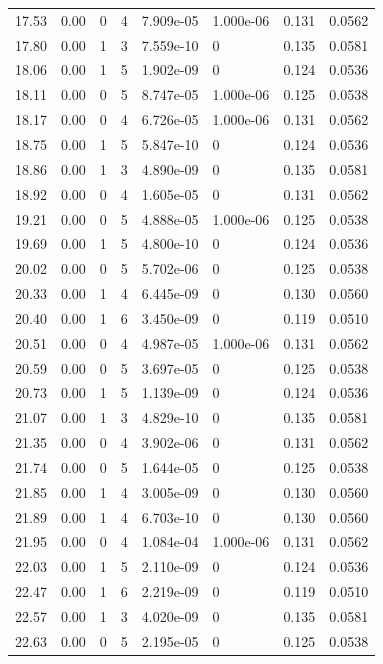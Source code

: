 \documentclass[preview]{standalone}
\begin{document}
{{{\begin{tabular}{L{1.2cm}C{1.2cm} C{0.3cm}C{0.5cm} C{1.4cm}C{1.4cm} C{1.4cm}C{1.4cm}}
  17.53  &  0.00  & 0     &  4 &  7.909e-05  & 1.000e-06  & 0.131 &  0.0562   \\ 
  17.80  &  0.00  & 1     &  3 &  7.559e-10  & 0  & 0.135 &  0.0581   \\ 
  18.06  &  0.00  & 1     &  5 &  1.902e-09  & 0  & 0.124 &  0.0536   \\ 
  18.11  &  0.00  & 0     &  5 &  8.747e-05  & 1.000e-06  & 0.125 &  0.0538   \\ 
  18.17  &  0.00  & 0     &  4 &  6.726e-05  & 1.000e-06  & 0.131 &  0.0562   \\ 
  18.75  &  0.00  & 1     &  5 &  5.847e-10  & 0  & 0.124 &  0.0536   \\ 
  18.86  &  0.00  & 1     &  3 &  4.890e-09  & 0  & 0.135 &  0.0581   \\ 
  18.92  &  0.00  & 0     &  4 &  1.605e-05  & 0  & 0.131 &  0.0562   \\ 
  19.21  &  0.00  & 0     &  5 &  4.888e-05  & 1.000e-06  & 0.125 &  0.0538   \\ 
  19.69  &  0.00  & 1     &  5 &  4.800e-10  & 0  & 0.124 &  0.0536   \\ 
  20.02  &  0.00  & 0     &  5 &  5.702e-06  & 0  & 0.125 &  0.0538   \\ 
  20.33  &  0.00  & 1     &  4 &  6.445e-09  & 0  & 0.130 &  0.0560   \\ 
  20.40  &  0.00  & 1     &  6 &  3.450e-09  & 0  & 0.119 &  0.0510   \\ 
  20.51  &  0.00  & 0     &  4 &  4.987e-05  & 1.000e-06  & 0.131 &  0.0562   \\ 
  20.59  &  0.00  & 0     &  5 &  3.697e-05  & 0  & 0.125 &  0.0538   \\ 
  20.73  &  0.00  & 1     &  5 &  1.139e-09  & 0  & 0.124 &  0.0536   \\ 
  21.07  &  0.00  & 1     &  3 &  4.829e-10  & 0  & 0.135 &  0.0581   \\ 
  21.35  &  0.00  & 0     &  4 &  3.902e-06  & 0  & 0.131 &  0.0562   \\ 
  21.74  &  0.00  & 0     &  5 &  1.644e-05  & 0  & 0.125 &  0.0538   \\ 
  21.85  &  0.00  & 1     &  4 &  3.005e-09  & 0  & 0.130 &  0.0560   \\ 
  21.89  &  0.00  & 1     &  4 &  6.703e-10  & 0  & 0.130 &  0.0560   \\ 
  21.95  &  0.00  & 0     &  4 &  1.084e-04  & 1.000e-06  & 0.131 &  0.0562   \\ 
  22.03  &  0.00  & 1     &  5 &  2.110e-09  & 0  & 0.124 &  0.0536   \\ 
  22.47  &  0.00  & 1     &  6 &  2.219e-09  & 0  & 0.119 &  0.0510   \\ 
  22.57  &  0.00  & 1     &  3 &  4.020e-09  & 0  & 0.135 &  0.0581   \\ 
  22.63  &  0.00  & 0     &  5 &  2.195e-05  & 0  & 0.125 &  0.0538   \\ 
\hline 
\end{tabular} 

}}}
\end{document}
